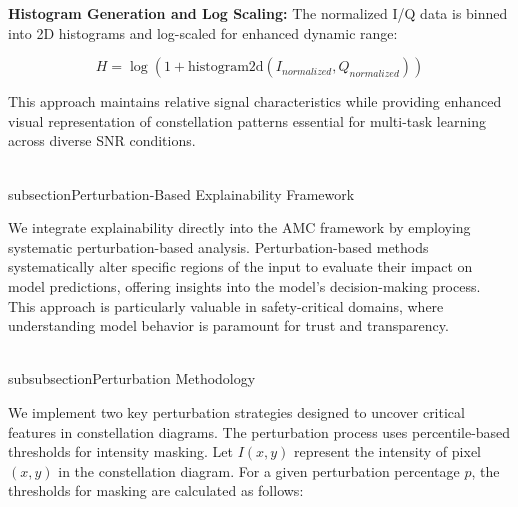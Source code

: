 \documentclass{ELSP}
\begin{document}
\textbf{Histogram Generation and Log Scaling:} The normalized I/Q data is binned into 2D histograms and log-scaled for enhanced dynamic range:

\begin{equation}
H = \log(1 + \text{histogram2d}(I_{normalized}, Q_{normalized}))
\end{equation}

This approach maintains relative signal characteristics while providing enhanced visual representation of constellation patterns essential for multi-task learning across diverse SNR conditions.

\\subsection{Perturbation-Based Explainability Framework}

We integrate explainability directly into the AMC framework by employing systematic perturbation-based analysis. Perturbation-based methods systematically alter specific regions of the input to evaluate their impact on model predictions, offering insights into the model's decision-making process. This approach is particularly valuable in safety-critical domains, where understanding model behavior is paramount for trust and transparency.

\\subsubsection{Perturbation Methodology}

We implement two key perturbation strategies designed to uncover critical features in constellation diagrams. The perturbation process uses percentile-based thresholds for intensity masking. Let $I(x,y)$ represent the intensity of pixel $(x,y)$ in the constellation diagram. For a given perturbation percentage $p$, the thresholds for masking are calculated as follows:
\end{document}
